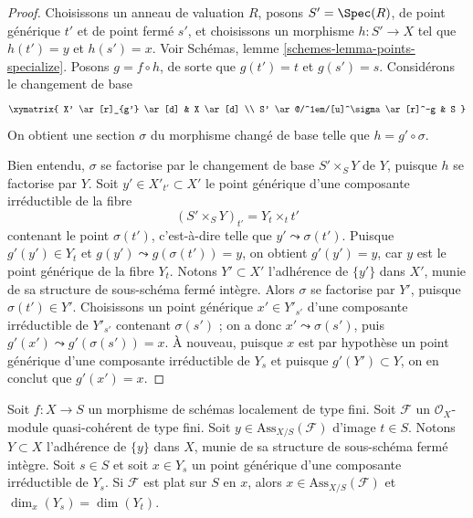 \begin{proof}
Choisissons un anneau de valuation $R$, posons $S' = \Spec(R)$, de
point générique $t'$ et de point fermé $s'$, et choisissons un morphisme
$h : S' \to X$ tel que $h(t') = y$ et $h(s') = x$.
Voir Schémas, lemme \ref{schemes-lemma-points-specialize}.
Posons $g = f \circ h$, de sorte que $g(t') = t$ et $g(s') = s$.
Considérons le changement de base
$$
\xymatrix{
X' \ar[r]_{g'} \ar[d] & X \ar[d] \\
S' \ar@/^1em/[u]^\sigma \ar[r]^-g & S
}
$$
On obtient une section $\sigma$ du morphisme changé de base telle que
$h = g' \circ \sigma$.

\medskip\noindent
Bien entendu, $\sigma$ se factorise par le changement de base $S' \times_S Y$ de $Y$,
puisque $h$ se factorise par $Y$. Soit $y' \in X'_{t'} \subset X'$ le
point générique d'une composante irréductible de la fibre
$$
(S' \times_S Y)_{t'} = Y_t \times_t t'
$$
contenant le point $\sigma(t')$, c'est-à-dire telle que
$y' \leadsto \sigma(t')$.
Puisque $g'(y') \in Y_t$ et $g(y') \leadsto g(\sigma(t')) = y$,
on obtient $g'(y') = y$, car $y$ est le point générique de
la fibre $Y_t$.
Notons $Y' \subset X'$ l'adhérence de $\{y'\}$ dans $X'$,
munie de sa structure de sous-schéma fermé intègre.
Alors $\sigma$ se factorise par $Y'$, puisque $\sigma(t') \in Y'$.
Choisissons un point générique $x' \in Y'_{s'}$ d'une composante
irréductible de $Y'_{s'}$ contenant $\sigma(s')$ ; on
a donc $x' \leadsto \sigma(s')$, puis $g'(x') \leadsto g'(\sigma(s')) = x$.
À nouveau, puisque $x$ est par hypothèse un point générique d'une
composante irréductible de $Y_s$
et puisque $g'(Y') \subset Y$, on en conclut que $g'(x') = x$.
\end{proof}

\begin{lemma}
\label{lemma-associated-point-specializes}
Soit $f : X \to S$ un morphisme de schémas localement de type fini.
Soit $\mathcal{F}$ un $\mathcal{O}_X$-module quasi-cohérent de type fini.
Soit $y \in \text{Ass}_{X/S}(\mathcal{F})$ d'image $t \in S$.
Notons $Y \subset X$ l'adhérence de $\{y\}$ dans $X$,
munie de sa structure de sous-schéma fermé intègre. Soit $s \in S$
et soit $x \in Y_s$ un point générique d'une composante irréductible
de $Y_s$. Si $\mathcal{F}$ est plat sur $S$ en $x$, alors
$x \in \text{Ass}_{X/S}(\mathcal{F})$ et
$\dim_x(Y_s) = \dim(Y_t)$.
\end{lemma}

